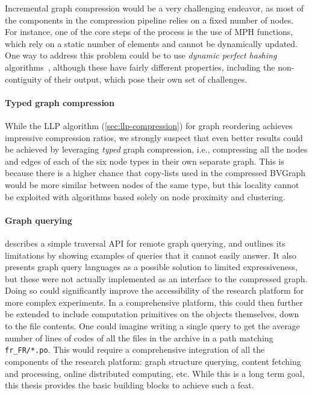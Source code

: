 Incremental graph compression would be a very challenging endeavor, as most of
the components in the compression pipeline relies on a fixed number of nodes.
For instance, one of the core steps of the process is the use of \gls{MPH}
functions, which rely on a static number of elements and cannot be dynamically
updated. One way to address this problem could be to use \emph{dynamic perfect
hashing} algorithms~\cite{fredman1984storing,dietzfelbinger1994dynamic},
although these have fairly different properties, including the non-contiguity
of their output, which pose their own set of challenges.

\paragraph*{Typed graph compression}

While the \gls{LLP} algorithm (\cref{sec:llp-compression}) for graph reordering
achieves impressive compression ratios, we strongly suspect that even
better results could be achieved by leveraging \emph{typed} graph compression,
i.e., compressing all the nodes and edges of each of the six node types in
their own separate graph. This is because there is a higher chance that
copy-lists used in the compressed BVGraph would be more similar between nodes
of the same type, but this locality cannot be exploited with algorithms based
solely on node proximity and clustering.

\paragraph*{Graph querying}

 describes a simple traversal API for remote graph
querying, and outlines its limitations by showing examples of queries that it
cannot easily answer. It also presents graph query languages as a possible
solution to limited expressiveness, but these were not actually implemented as
an interface to the compressed graph. Doing so could significantly improve the
accessibility of the research platform for more complex experiments. In a
comprehensive platform, this could then further be extended to include
computation primitives on the objects themselves, down to the file contents.
One could imagine writing a single query to get the average number of lines of
codes of all the files in the archive in a path matching
\texttt{fr_FR/*.po}.  This would require a comprehensive integration
of all the components of the research platform: graph structure querying,
content fetching and processing, online distributed computing, etc. While this
is a long term goal, this thesis provides the basic building blocks to achieve
such a feat.

